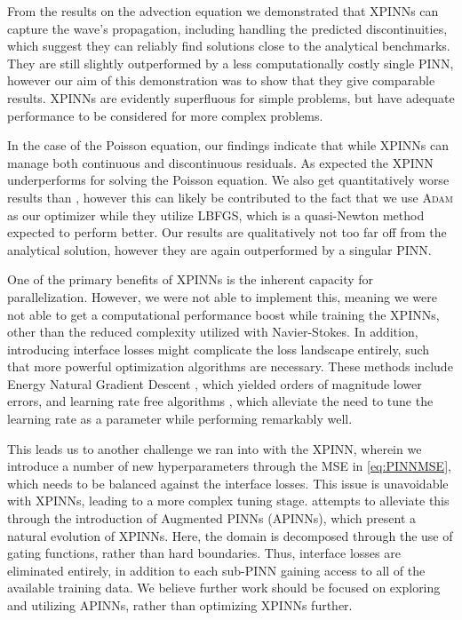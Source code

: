 From the results on the advection equation we demonstrated that XPINNs can capture the wave's propagation, including handling the predicted discontinuities, which suggest they can reliably find solutions close to the analytical benchmarks.
They are still slightly outperformed by a less computationally costly single PINN, however our aim of this demonstration was to show that they give comparable results.
XPINNs are evidently superfluous for simple problems, but have adequate performance to be considered for more complex problems.

In the case of the Poisson equation, our findings indicate that while XPINNs can manage both continuous and discontinuous residuals.
As expected the XPINN underperforms for solving the Poisson equation.
We also get quantitatively worse results than \textcite{XPINN_generalize}, however this can likely be contributed to the fact that we use \textsc{Adam} as our optimizer while they utilize LBFGS, which is a quasi-Newton method expected to perform better.
Our results are qualitatively not too far off from the analytical solution, however they are again outperformed by a singular PINN.

One of the primary benefits of XPINNs is the inherent capacity for parallelization.
However, we were not able to implement this, meaning we were not able to get a computational performance boost while training the XPINNs, other than the reduced complexity utilized with Navier-Stokes.
In addition, introducing interface losses might complicate the loss landscape entirely, such that more powerful optimization algorithms are necessary.
These methods include Energy Natural Gradient Descent \cite{müller2023achieving}, which yielded orders of magnitude lower errors, and learning rate free algorithms \cite{sharrock2023learning}, which alleviate the need to tune the learning rate as a parameter while performing remarkably well.

This leads us to another challenge we ran into with the XPINN, wherein we introduce a number of new hyperparameters through the MSE in \eqref{eq:PINNMSE}, which needs to be balanced against the interface losses.
This issue is unavoidable with XPINNs, leading to a more complex tuning stage.
\textcite{Hu_2023} attempts to alleviate this through the introduction of Augmented PINNs (APINNs), which present a natural evolution of XPINNs.
Here, the domain is decomposed through the use of gating functions, rather than hard boundaries.
Thus, interface losses are eliminated entirely, in addition to each sub-PINN gaining access to all of the available training data.
We believe further work should be focused on exploring and utilizing APINNs, rather than optimizing XPINNs further.

